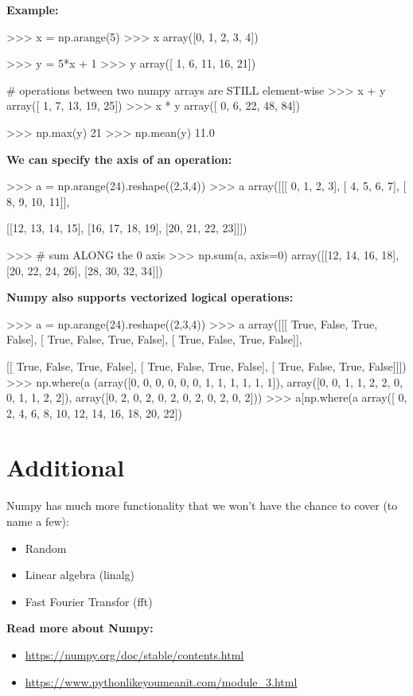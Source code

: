 \documentclass[12pt]{article}
\numberwithin{equation}{section}
\begin{document}
\textbf{Example:}
\begin{python}
>>> x = np.arange(5)
>>> x
array([0, 1, 2, 3, 4])

>>> y = 5*x + 1
>>> y
array([ 1,  6, 11, 16, 21])

# operations between two numpy arrays are STILL element-wise
>>> x + y
array([ 1,  7, 13, 19, 25])
>>> x * y
array([ 0,  6, 22, 48, 84])

>>> np.max(y)
21
>>> np.mean(y)
11.0
\end{python}
\textbf{We can specify the axis of an operation:}
\begin{python}
>>> a = np.arange(24).reshape((2,3,4))
>>> a
array([[[ 0,  1,  2,  3],
        [ 4,  5,  6,  7],
        [ 8,  9, 10, 11]],

       [[12, 13, 14, 15],
        [16, 17, 18, 19],
        [20, 21, 22, 23]]])

>>> # sum ALONG the 0 axis
>>> np.sum(a, axis=0)
array([[12, 14, 16, 18],
       [20, 22, 24, 26],
       [28, 30, 32, 34]])
\end{python}

\textbf{Numpy also supports vectorized logical operations: }
\begin{python}
>>> a = np.arange(24).reshape((2,3,4))
>>> a%
array([[[ True, False,  True, False],
        [ True, False,  True, False],
        [ True, False,  True, False]],

       [[ True, False,  True, False],
        [ True, False,  True, False],
        [ True, False,  True, False]]])
>>> np.where(a%
(array([0, 0, 0, 0, 0, 0, 1, 1, 1, 1, 1, 1]), 
 array([0, 0, 1, 1, 2, 2, 0, 0, 1, 1, 2, 2]), 
 array([0, 2, 0, 2, 0, 2, 0, 2, 0, 2, 0, 2]))
>>> a[np.where(a%
array([ 0,  2,  4,  6,  8, 10, 12, 14, 16, 18, 20, 22])
\end{python}

\section{Additional}
Numpy has much more functionality that we won't have the chance to cover (to name a few):
\begin{itemize}
    \item Random
    \item Linear algebra (linalg)
    \item Fast Fourier Transfor (fft)
\end{itemize}

\textbf{Read more about Numpy:}
\begin{itemize}
    \item \url{https://numpy.org/doc/stable/contents.html}
    \item \url{https://www.pythonlikeyoumeanit.com/module_3.html}
\end{itemize}   
\end{document}

